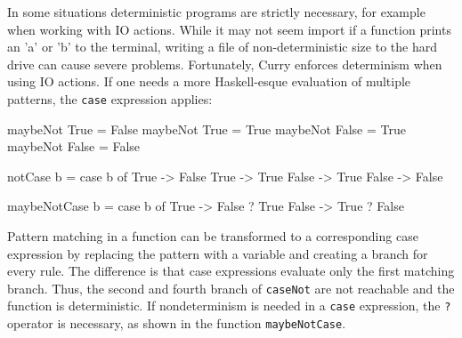 \documentclass[paper = a4, fleqn, abstract=on, twoside]{scrreprt}
\begin{document}
\par
In some situations deterministic programs are strictly necessary, for example when working with IO actions. While it may not seem import if a function prints an 'a' or 'b' to the terminal, writing a file of non-deterministic size to the hard drive can cause severe problems. Fortunately, Curry enforces determinism when using IO actions. If one needs a more Haskell-esque evaluation of multiple patterns, the \texttt{case} expression applies:
\begin{flushleft}
	\begin{minipage}[t]{.3 \linewidth}
		\begin{haskellcode}
maybeNot True  = False
maybeNot True  = True
maybeNot False = True
maybeNot False = False
		\end{haskellcode}
	\end{minipage}
	\hfill
	\vrule
	\hspace{.5 em}
	\begin{minipage}[t]{.25 \linewidth}
		\begin{haskellcode}
notCase b =
  case b of
    True  -> False
    True  -> True
    False -> True
    False -> False
		\end{haskellcode}
	\end{minipage}
	\hfill
	\vrule
	\hspace{.5 em}
	\begin{minipage}[t]{.35 \linewidth}
		\begin{haskellcode}
maybeNotCase b =
  case b of
    True  -> False ? True 
    False -> True  ? False
		\end{haskellcode}
	\end{minipage}
\end{flushleft}
Pattern matching in a function can be transformed to a corresponding case expression by replacing the pattern with a variable and creating a branch for every rule. The difference is that case expressions evaluate only the first matching branch. Thus, the second and fourth branch of \texttt{caseNot} are not reachable and the function is deterministic. If nondeterminism is needed in a \texttt{case} expression, the \texttt{?} operator is necessary, as shown in the function \texttt{maybeNotCase}.
\end{document}
